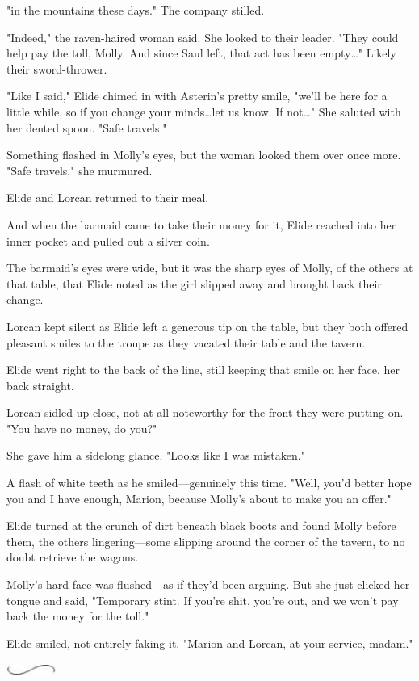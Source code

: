 "in the mountains these days."
The company stilled.

"Indeed," the raven-haired woman said.
She looked to their leader.
"They could help pay the toll, Molly.
And since Saul left, that act has been empty\ldots" Likely their sword-thrower.

"Like I said," Elide chimed in with Asterin's pretty smile, "we'll be here for a little while, so if you change your minds\ldots let us know.
If not\ldots" She saluted with her dented spoon.
"Safe travels."

Something flashed in Molly's eyes, but the woman looked them over once more.
"Safe travels," she murmured.

Elide and Lorcan returned to their meal.

And when the barmaid came to take their money for it, Elide reached into her inner pocket and pulled out a silver coin.

The barmaid's eyes were wide, but it was the sharp eyes of Molly, of the others at that table, that Elide noted as the girl slipped away and brought back their change.

Lorcan kept silent as Elide left a generous tip on the table, but they both offered pleasant smiles to the troupe as they vacated their table and the tavern.

Elide went right to the back of the line, still keeping that smile on her face, her back straight.

Lorcan sidled up close, not at all noteworthy for the front they were putting on.
"You have no money, do you?"

She gave him a sidelong glance.
"Looks like I was mistaken."

A flash of white teeth as he smiled---genuinely this time.
"Well, you'd better hope you and I have enough, Marion, because Molly's about to make you an offer."

Elide turned at the crunch of dirt beneath black boots and found Molly before them, the others lingering---some slipping around the corner of the tavern, to no doubt retrieve the wagons.

Molly's hard face was flushed---as if they'd been arguing.
But she just clicked her tongue and said, "Temporary stint.
If you're shit, you're out, and we won't pay back the money for the toll."

Elide smiled, not entirely faking it.
"Marion and Lorcan, at your service, madam."

\begin{center}
	\includegraphics[width=0.65in,height=0.13in]{images/seperator}
\end{center}

